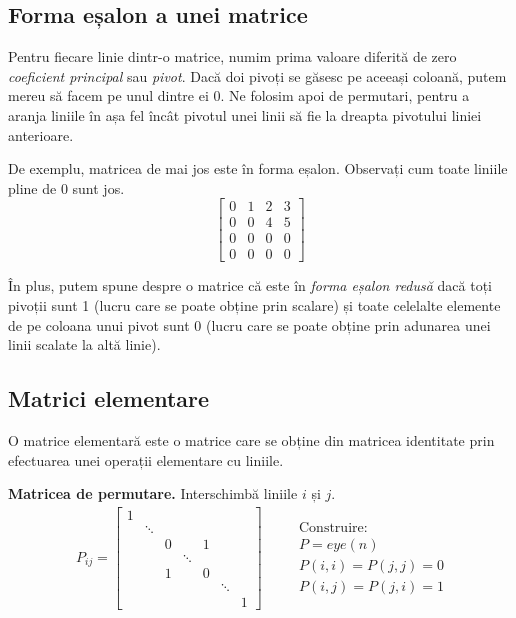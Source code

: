 \documentclass{exam}
\begin{document}
\subsection{Forma eșalon a unei matrice}

Pentru fiecare linie dintr-o matrice, numim prima valoare diferită de zero
\textit{coeficient principal} sau \textit{pivot}. Dacă doi pivoți se găsesc pe
aceeași coloană, putem mereu să facem pe unul dintre ei 0. Ne folosim apoi de
permutari, pentru a aranja liniile în așa fel încât pivotul unei linii să fie
la dreapta pivotului liniei anterioare.

De exemplu, matricea de mai jos este în forma eșalon. Observați cum toate
liniile pline de 0 sunt jos.
\begin{equation*}
	\begin{bmatrix}
		0 & 1 & 2 & 3 \\
		0 & 0 & 4 & 5 \\
		0 & 0 & 0 & 0 \\
		0 & 0 & 0 & 0
	\end{bmatrix}
\end{equation*}

În plus, putem spune despre o matrice că este în
\textit{forma eșalon redusă} dacă toți pivoții sunt 1 (lucru care se poate
obține prin scalare) și toate celelalte elemente de pe coloana unui pivot sunt 0
(lucru care se poate obține prin adunarea unei linii scalate la altă linie).

\subsection{Matrici elementare}

O matrice elementară este o matrice care se obține din matricea identitate
prin efectuarea unei operații elementare cu liniile.

\textbf{Matricea de permutare.} Interschimbă liniile $i$ și $j$.
\begin{equation*}
	\begin{split}
		P_{ij} = \begin{bmatrix}
			         1 &        &   &        &   &        &   \\
			           & \ddots &   &        &   &        &   \\
			           &        & 0 &        & 1 &        &   \\
			           &        &   & \ddots &   &        &   \\
			           &        & 1 &        & 0 &        &   \\
			           &        &   &        &   & \ddots &   \\
			           &        &   &        &   &        & 1
		         \end{bmatrix}
	\end{split}
	\quad
	\begin{split}
		 & \text{Construire:}      \\
		 & P = eye(n)              \\
		 & P (i, i) = P (j, j) = 0 \\
		 & P (i, j) = P (j, i) = 1
	\end{split}
\end{equation*}
\end{document}
